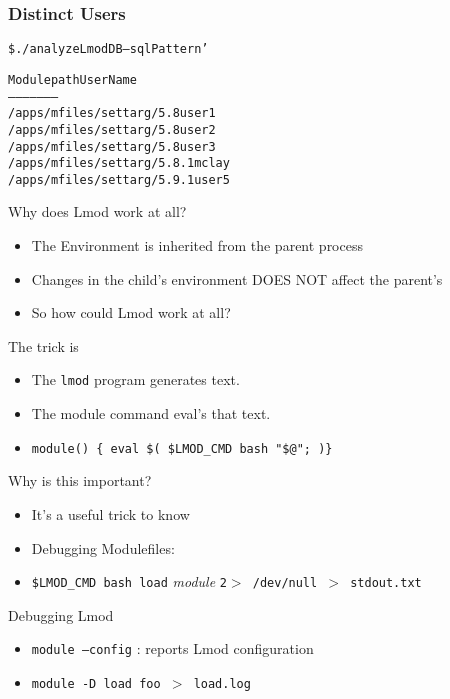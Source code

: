 \documentclass[dvipsnames,aspectratio=169]{beamer}
\begin{document}
\begin{frame}[fragile]
    \frametitle{Distinct Users}
  {\small
    \begin{alltt}
\$ ./analyzeLmodDB --sqlPattern '%/settarg/%' usernames

Module path                   User Name
-----------                   ---------
/apps/mfiles/settarg/5.8      user1
/apps/mfiles/settarg/5.8      user2
/apps/mfiles/settarg/5.8      user3
/apps/mfiles/settarg/5.8.1    mclay
/apps/mfiles/settarg/5.9.1    user5
    \end{alltt}
}
\end{frame}

\begin{frame}{Why does Lmod work at all?}
  \begin{itemize}
    \item The Environment is inherited from the parent process
    \item Changes in the child's environment DOES NOT affect the parent's
    \item So how could Lmod work at all? 
  \end{itemize}
\end{frame}

\begin{frame}{The trick is}
  \begin{itemize}
    \item The \texttt{lmod} program generates text.
    \item The module command eval's that text.
    \item \texttt{module() \{ eval \$( \$LMOD\_CMD bash "\$@"; )\}}
  \end{itemize}
\end{frame}

\begin{frame}{Why is this important?}
  \begin{itemize}
    \item It's a useful trick to know
    \item Debugging Modulefiles:
    \item \texttt{\$LMOD\_CMD bash load} \emph{module} \texttt{2$>$
        /dev/null $>$ stdout.txt}
  \end{itemize}
\end{frame}

\begin{frame}{Debugging Lmod}
  \begin{itemize}
    \item \texttt{module --config} : reports Lmod configuration
    \item \texttt{module -D load foo $>$ load.log}
  \end{itemize}
\end{frame}
\end{document}
